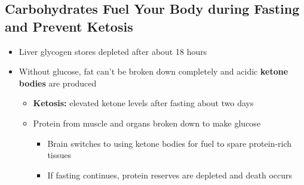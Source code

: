 \documentclass[12pt]{article}
\begin{document}
        \subsection{Carbohydrates Fuel Your Body during Fasting and Prevent Ketosis}
            \begin{itemize}
                \item Liver glycogen stores depleted after about 18 hours
                \item Without glucose, fat can't be broken down completely and acidic \textbf{ketone bodies} are produced
                    \begin{itemize}
                        \item \textbf{Ketosis:} elevated ketone levels after fasting about two days
                        \item Protein from muscle and organs broken down to make glucose
                            \begin{itemize}
                                \item Brain switches to using ketone bodies for fuel to spare protein-rich tissues
                                \item If fasting continues, protein reserves are depleted and death occurs
                            \end{itemize}
                    \end{itemize}
            \end{itemize}
\end{document}
